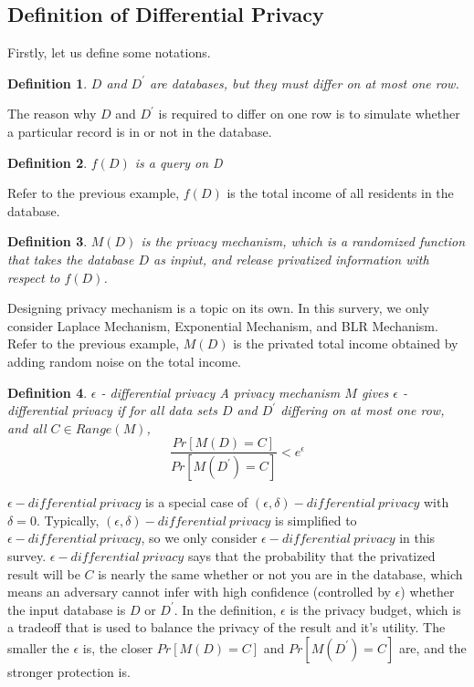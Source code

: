 \documentclass[a4paper, 11pt]{article} %
\newtheorem{definition}{Definition}[section]
\begin{document}
\subsection{Definition of Differential Privacy}
Firstly, let us define some notations.
\theoremstyle{definition}
\begin{definition}{}
 $D$ and $D^\prime$ are databases, but they must differ on at most one row.
\end{definition}
The reason why $D$ and $D^\prime$ is required to differ on one row is to simulate whether a particular record is in or not in the database.
\begin{definition}{}
$f(D)$ is a query on D
\end{definition}
Refer to the previous example, $f(D)$ is the total income of all residents in the database.
\begin{definition}{}
	$M(D)$ is the privacy mechanism, which is a randomized function that takes the database $D$ as inpiut, and release privatized information with respect to $f(D)$.
\end{definition}
Designing privacy mechanism is a topic on its own\cite{mcsherry2007mechanism}. In this survery, we only consider Laplace Mechanism, Exponential Mechanism, and BLR Mechanism. Refer to the previous example, $M(D)$ is the privated total income obtained by adding random noise on the total income.
\begin{definition}{$\epsilon$ - differential privacy}
	A privacy mechanism $M$ gives $\epsilon$ - differential privacy if for all data sets $D$ and $D^\prime$ differing on at most one row, and all $C\in Range(M)$,
	\[  \frac{Pr[M(D) = C]}{Pr[M(D^\prime) = C]}< e^\epsilon \]
\end{definition}
$\epsilon - differential \ privacy$ is a special case of $(\epsilon,\delta) - differential \ privacy$\cite{dwork2011differential,dwork2006our} with $\delta = 0$. Typically, $(\epsilon,\delta) - differential \ privacy$ is simplified to $\epsilon - differential \ privacy$, so we only consider $\epsilon - differential \ privacy$ in this survey. $\epsilon - differential \ privacy$ says that the probability that the privatized result will be $C$ is nearly the same whether or not you are in the database, which means an adversary cannot infer with high confidence (controlled by $\epsilon$) whether the input database is $D$ or $D^\prime$. In the definition, $\epsilon$ is the privacy budget, which is a tradeoff that is used to balance the privacy of the result and it's utility. The smaller the $\epsilon$ is, the closer $Pr[M(D) = C]$ and $Pr[M(D^\prime) = C]$ are, and the stronger protection is.
\end{document}

